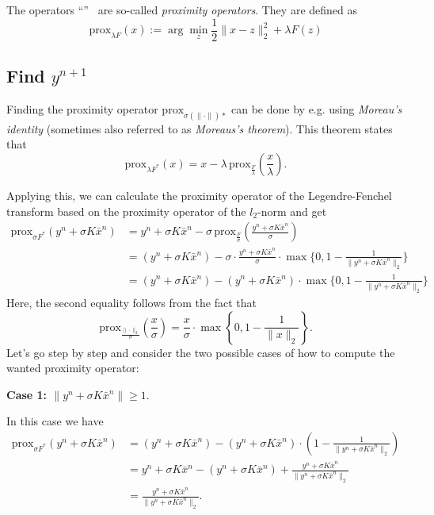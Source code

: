 \documentclass{paper}
\newcommand{\prox}{\text{prox}}
\begin{document}
The operators ``\prox'' \, are so-called \emph{proximity operators}. They are defined as 
\begin{equation}\prox_{\lambda F}(x) := \arg\min_z \frac{1}{2} \|x-z\|_2^2 + \lambda F(z)
\label{eq:def-proximity-operator}
\end{equation}

\subsection{Find $y^{n+1}$}
Finding the proximity operator $\prox_{\sigma (\|\cdot\|)*}$ can be done by e.g. using \emph{Moreau's identity} (sometimes also referred to as \emph{Moreaus's theorem}). This theorem states that
$$\prox_{\lambda F^*}(x) = x - \lambda\, \prox_{\frac{F}{\lambda}}\left(\frac{x}{\lambda}\right).$$

Applying this, we can calculate the proximity operator of the Legendre-Fenchel transform based on the proximity operator of the $l_2$-norm and get
\begin{align*}
 \prox_{\sigma F^*}(y^n + \sigma K \bar x^n) &= y^n + \sigma K \bar x^n - \sigma \, \prox_{\frac{F}{\sigma}}\left(\frac{y^n + \sigma K \bar x^n}{\sigma} \right) \\
 &= (y^n + \sigma K \bar x^n) - \sigma \cdot \frac{y^n + \sigma K \bar x^n}{\sigma} \cdot \max\{0, 1 - \frac{1}{\|y^n + \sigma K \bar x^n\|_2}\} \\
 &= (y^n + \sigma K \bar x^n) - (y^n + \sigma K \bar x^n) \cdot \max\{0, 1 - \frac{1}{\|y^n + \sigma K \bar x^n\|_2}\}
\end{align*}
Here, the second equality follows from the fact that $$\prox_{\frac{\|\cdot\|_2}{\sigma}}(\frac{x}{\sigma}) = \frac{x}{\sigma} \cdot \max\left\{0,1-\frac{1}{\|x\|_2}\right\}.$$
Let's go step by step and consider the two possible cases of how to compute the wanted proximity operator:

\textbf{Case 1: $\|y^n + \sigma K \bar x^n\| \geq 1.$}

In this case we have 
\begin{align*}
 \prox_{\sigma F^*}(y^n + \sigma K \bar x^n) &= (y^n + \sigma K \bar x^n) - (y^n + \sigma K \bar x^n) \cdot \left(1 - \frac{1}{\|y^n + \sigma K \bar x^n\|_2}\right) \\
 &= y^n + \sigma K \bar x^n - (y^n + \sigma K \bar x^n) + \frac{y^n + \sigma K \bar x^n}{\|y^n + \sigma K \bar x^n\|_2} \\
 &= \frac{y^n + \sigma K \bar x^n}{\|y^n + \sigma K \bar x^n\|_2}.
\end{align*}
\end{document}
